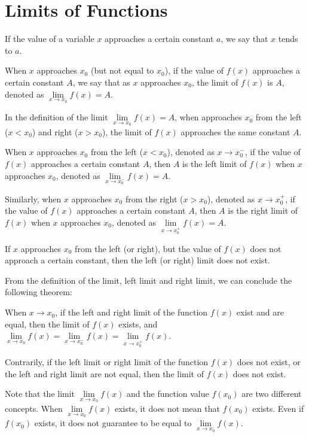 \documentclass[12pt]{report}
\begin{document}
\section{Limits of Functions}

If the value of a variable $x$ approaches a certain constant $a$, we say that
$x$ tends to $a$.

When $x$ approaches $x_0$ (but not equal to $x_0$), if the value of $f(x)$
approaches a certain constant $A$, we say that as $x$ approaches $x_0$, the
limit of $f(x)$ is $A$, denoted as $\lim\limits_{x \to x_0} f(x) = A$.

In the definition of the limit $\lim\limits_{x \to x_0} f(x) = A$, when
approaches $x_0$ from the left ($x < x_0$) and right ($x > x_0$), the limit of
$f(x)$ approaches the same constant $A$.

When $x$ approaches $x_0$ from the left ($x < x_0$), denoted as $x \to x_0^-$,
if the value of $f(x)$ approaches a certain constant $A$, then $A$ is the left
limit of $f(x)$ when $x$ approaches $x_0$, denoted as $\lim\limits_{x \to
    x_0^-} f(x) = A$.

Similarly, when $x$ approaches $x_0$ from the right ($x > x_0$), denoted as $x
  \to x_0^+$, if the value of $f(x)$ approaches a certain constant $A$, then $A$
is the right limit of $f(x)$ when $x$ approaches $x_0$, denoted as
$\lim\limits_{x \to x_0^+} f(x) = A$.

If $x$ approaches $x_0$ from the left (or right), but the value of $f(x)$ does
not approach a certain constant, then the left (or right) limit does not exist.

From the definition of the limit, left limit and right limit, we can conclude
the following theorem:
\begin{mdframed}[style=MyFrame]
  When $x \to x_0$, if the left and right limit of the function $f(x)$ exist and are equal, then the limit of $f(x)$ exists, and $\lim\limits_{x \to x_0} f(x) = \lim\limits_{x \to x_0^-} f(x) = \lim\limits_{x \to x_0^+} f(x)$.

  Contrarily, if the left limit or right limit of the function $f(x)$ does not
  exist, or the left and right limit are not equal, then the limit of $f(x)$ does
  not exist.
\end{mdframed}

Note that the limit $\lim\limits_{x \to x_0} f(x)$ and the function value
$f(x_0)$ are two different concepts. When $\lim\limits_{x \to x_0} f(x)$
exists, it does not mean that $f(x_0)$ exists. Even if $f(x_0)$ exists, it does
not guarantee to be equal to $\lim\limits_{x \to x_0} f(x)$.
\end{document}
